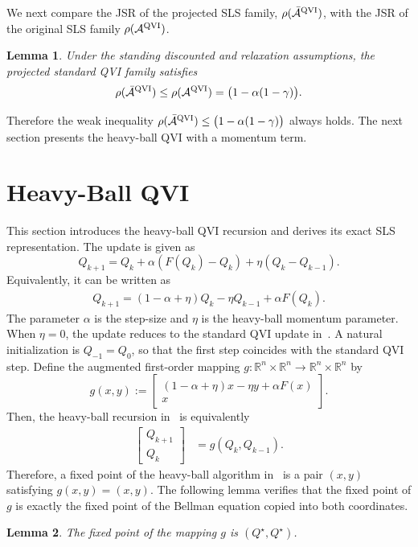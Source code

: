 \documentclass[letterpaper]{article}
\numberwithin{equation}{section}
\newtheorem{lemma}{Lemma}[section]
\newcommand{\R}{\mathbb{R}}
\begin{document}
We next compare the JSR of the projected SLS family,
$\rho(\bar{\mathcal A}^{\rm QVI})$, with the JSR of the original SLS family
$\rho(\mathcal A^{\rm QVI})$.
\begin{lemma}
\label{lem:projected-ql-weak-bound}
Under the standing discounted and relaxation assumptions, the projected standard
QVI family satisfies
\begin{align*}
  \rho(\bar{\mathcal A}^{\rm QVI})
  \le \rho(\mathcal A^{\rm QVI})
  =\bigl(1-\alpha(1-\gamma)\bigr).
\end{align*}
\end{lemma}

Therefore the weak inequality
$\rho(\bar{\mathcal A}^{\rm QVI})\le\bigl(1-\alpha(1-\gamma)\bigr)$ always holds.
The next section presents the heavy-ball QVI with a momentum term.

\section{Heavy-Ball QVI}
\label{sec:heavy_ball_bellman_residual}

This section introduces the heavy-ball QVI recursion and derives
its exact SLS representation. The update is given as
\begin{equation}
  Q_{k+1}
  =Q_k+\alpha(F(Q_k)-Q_k)+\eta(Q_k-Q_{k-1}).
  \label{eq:simple-heavy-ball}
\end{equation}
Equivalently, it can be written as
\begin{align*}
  Q_{k+1}=(1-\alpha+\eta)Q_k-\eta Q_{k-1}+\alpha F(Q_k).
\end{align*}
The parameter $\alpha$ is the step-size and $\eta$ is the heavy-ball
momentum parameter. When $\eta=0$, the update reduces to the standard QVI update in~. A natural initialization is $Q_{-1}=Q_0$, so that the first
step coincides with the standard QVI step.
Define the augmented first-order mapping $g:\R^n\times\R^n\to\R^n\times\R^n$ by
\begin{equation*}
  g(x,y):=
  \begin{bmatrix}
    (1-\alpha+\eta)x-\eta y+\alpha F(x)\\
    x
  \end{bmatrix}.
\end{equation*}
Then, the heavy-ball recursion in~ is equivalently
\begin{equation*}
\begin{aligned}
\begin{bmatrix}Q_{k+1}\\Q_k\end{bmatrix}
&=g(Q_k,Q_{k-1}).
\end{aligned}
\end{equation*}
Therefore, a fixed point of the heavy-ball algorithm in~ is a pair $(x,y)$ satisfying
$g(x,y)=(x,y)$. The following lemma verifies that the fixed point of $g$ is
exactly the fixed point of the Bellman equation copied into both coordinates.
\begin{lemma}
\label{lem:hb-fixed-point-unchanged}
The fixed point of the mapping $g$ is $(Q^\star,Q^\star)$.
\end{lemma}
\end{document}
